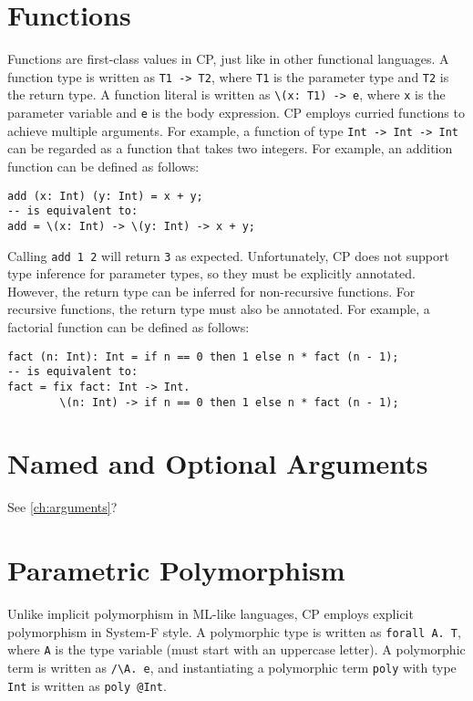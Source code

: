 \section{Functions}

Functions are first-class values in CP, just like in other functional languages.
A function type is written as \lstinline{T1 -> T2}, where \lstinline{T1} is the
parameter type and \lstinline{T2} is the return type. A function literal is
written as \lstinline|\(x: T1) -> e|, where \lstinline{x} is the parameter
variable and \lstinline{e} is the body expression. CP employs curried functions
to achieve multiple arguments. For example, a function of type
\lstinline{Int -> Int -> Int} can be regarded as a function that takes two
integers. For example, an addition function can be defined as follows:
\begin{lstlisting}
add (x: Int) (y: Int) = x + y;
-- is equivalent to:
add = \(x: Int) -> \(y: Int) -> x + y;
\end{lstlisting}
Calling \lstinline{add 1 2} will return \lstinline{3} as expected.
Unfortunately, CP does not support type inference for parameter types, so they
must be explicitly annotated. However, the return type can be inferred for
non-recursive functions. For recursive functions, the return type must also be
annotated. For example, a factorial function can be defined as follows:
\begin{lstlisting}
fact (n: Int): Int = if n == 0 then 1 else n * fact (n - 1);
-- is equivalent to:
fact = fix fact: Int -> Int.
        \(n: Int) -> if n == 0 then 1 else n * fact (n - 1);
\end{lstlisting}

\section{Named and Optional Arguments}

See \autoref{ch:arguments}?

\section{Parametric Polymorphism}

Unlike implicit polymorphism in ML-like languages, CP employs explicit
polymorphism in System-F style. A polymorphic type is written as
\lstinline{forall A. T}, where \lstinline{A} is the type variable (must start
with an uppercase letter). A polymorphic term is written as \lstinline|/\A. e|,
and instantiating a polymorphic term \lstinline{poly} with type \lstinline{Int}
is written as \lstinline{poly @Int}.


